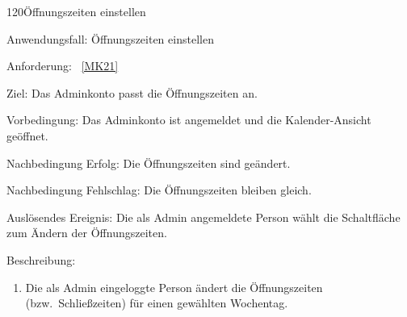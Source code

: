 \pagebreak

\begin{function}{120}{Öffnungszeiten einstellen}
    \item[Anwendungsfall:] Öffnungszeiten einstellen
    \item[Anforderung:]~\ref{MK21}
    \item[Ziel:] Das Adminkonto passt die Öffnungszeiten an.
    \item[Vorbedingung:] Das Adminkonto ist angemeldet und die Kalender-Ansicht geöffnet.
    \item[Nachbedingung Erfolg:] Die Öffnungszeiten sind geändert.
    \item[Nachbedingung Fehlschlag:] Die Öffnungszeiten bleiben gleich.
    \item[Auslösendes Ereignis:] Die als Admin angemeldete Person wählt die Schaltfläche zum Ändern der Öffnungszeiten.
    \item[Beschreibung:] ~
    \begin{enumerate}
        \item Die als Admin eingeloggte Person ändert die Öffnungszeiten (bzw.\ Schließzeiten) für einen gewählten Wochentag.
    \end{enumerate}
\end{function}